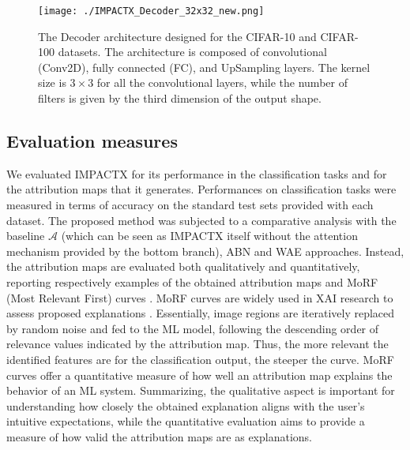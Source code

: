 

\begin{figure}[ht]
    \centering
\texttt{[image: ./IMPACTX\_Decoder\_32x32\_new.png]}
    \caption{The Decoder architecture designed for the CIFAR-10 and CIFAR-100 datasets. The architecture is composed of convolutional (Conv2D), fully connected (FC), and UpSampling layers. The kernel size is $3 \times 3$ for all the convolutional layers, while the number of filters is given by the third dimension of the output shape.}
    \label{fig:Decoder}
\end{figure}


\subsection{Evaluation measures}
We evaluated IMPACTX for its performance in the classification tasks and for the attribution maps that it generates. Performances on classification tasks were measured in terms of accuracy on the standard test sets provided with each dataset. The proposed method was subjected to a comparative analysis with the baseline $\mathcal{A}$ (which can be seen as IMPACTX itself without the attention mechanism provided by the bottom branch), ABN \citep{fukui2019attention} and WAE \citep{apicella2023shap} approaches.
Instead, the attribution maps are evaluated both qualitatively and quantitatively, reporting respectively examples of the obtained attribution maps and MoRF (Most Relevant First) curves \citep{samek2016evaluating}.  MoRF curves are widely used in XAI research to assess proposed explanations  \citep{kakogeorgiou2021evaluating, apicella2022exploiting, tjoa2022quantifying, islam2022systematic}. Essentially, image regions are iteratively replaced by random noise and fed to the ML model, following the descending order of relevance values indicated by the attribution map. Thus, the more relevant the identified features are for the classification output, the steeper the curve. MoRF curves offer a quantitative measure of how well an attribution map explains the behavior of an ML system. Summarizing, the qualitative aspect is important for understanding how closely the obtained explanation aligns with the user's intuitive expectations, while the quantitative evaluation aims to provide a measure of how valid the attribution maps are as explanations. %

